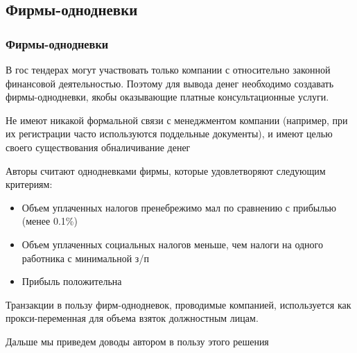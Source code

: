 \subsection{Фирмы-однодневки}

\begin{frame}

\frametitle{Фирмы-однодневки}
В гос тендерах могут участвовать только компании с относительно законной финансовой деятельностью. Поэтому для вывода денег необходимо создавать фирмы-однодневки, якобы оказывающие платные консультационные услуги.
\vspace{3mm}

Не имеют никакой формальной связи с менеджментом компании (например, при их регистрации часто используются поддельные документы), и имеют целью своего существования обналичивание денег
\vspace{3mm}
\end{frame}


\begin{frame}
Авторы считают однодневками фирмы, которые удовлетворяют следующим критериям:
\begin{itemize}
\item Объем уплаченных налогов пренебрежимо мал по сравнению с прибылью (менее 0.1\%)
\item Объем уплаченных социальных налогов меньше, чем налоги на одного работника с минимальной з/п
\item Прибыль положительна
\end{itemize}
\vspace{3mm}

Транзакции в пользу фирм-однодневок, проводимые компанией, используется как прокси-переменная для объема взяток должностным лицам. 
\vspace{3mm}

Дальше мы приведем доводы автором в пользу этого решения

\end{frame}